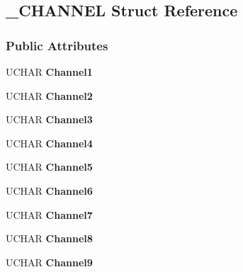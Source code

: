 \hypertarget{struct___c_h_a_n_n_e_l}{
\subsection{\_\-CHANNEL Struct Reference}
\label{struct___c_h_a_n_n_e_l}
}
\subsubsection*{Public Attributes}
\begin{DoxyCompactItemize}
\item 
\hypertarget{struct___c_h_a_n_n_e_l_a216b9cd5d660b6c4eef38c65f3eed535}{
UCHAR {\bfseries Channel1}}
\label{struct___c_h_a_n_n_e_l_a216b9cd5d660b6c4eef38c65f3eed535}

\item 
\hypertarget{struct___c_h_a_n_n_e_l_a68da091fddf532cb1097c102746a5724}{
UCHAR {\bfseries Channel2}}
\label{struct___c_h_a_n_n_e_l_a68da091fddf532cb1097c102746a5724}

\item 
\hypertarget{struct___c_h_a_n_n_e_l_aef6d3125a237a7d53323c88ab925f88e}{
UCHAR {\bfseries Channel3}}
\label{struct___c_h_a_n_n_e_l_aef6d3125a237a7d53323c88ab925f88e}

\item 
\hypertarget{struct___c_h_a_n_n_e_l_a56e9c793c78f1728ced1efc16e453ce9}{
UCHAR {\bfseries Channel4}}
\label{struct___c_h_a_n_n_e_l_a56e9c793c78f1728ced1efc16e453ce9}

\item 
\hypertarget{struct___c_h_a_n_n_e_l_a96f39cf6d3ecc36ddf81173f5ff6c355}{
UCHAR {\bfseries Channel5}}
\label{struct___c_h_a_n_n_e_l_a96f39cf6d3ecc36ddf81173f5ff6c355}

\item 
\hypertarget{struct___c_h_a_n_n_e_l_a208ae918a4d3a9b2989a3a11773cadd8}{
UCHAR {\bfseries Channel6}}
\label{struct___c_h_a_n_n_e_l_a208ae918a4d3a9b2989a3a11773cadd8}

\item 
\hypertarget{struct___c_h_a_n_n_e_l_a0e563936cd136af0781b66b9671e6c0d}{
UCHAR {\bfseries Channel7}}
\label{struct___c_h_a_n_n_e_l_a0e563936cd136af0781b66b9671e6c0d}

\item 
\hypertarget{struct___c_h_a_n_n_e_l_a99717f3a7feecb8a5d2f05af263c79f5}{
UCHAR {\bfseries Channel8}}
\label{struct___c_h_a_n_n_e_l_a99717f3a7feecb8a5d2f05af263c79f5}

\item 
\hypertarget{struct___c_h_a_n_n_e_l_ae6887f3ee851ace43e36e6a55985e3fc}{
UCHAR {\bfseries Channel9}}
\label{struct___c_h_a_n_n_e_l_ae6887f3ee851ace43e36e6a55985e3fc}


\end{DoxyCompactItemize}
